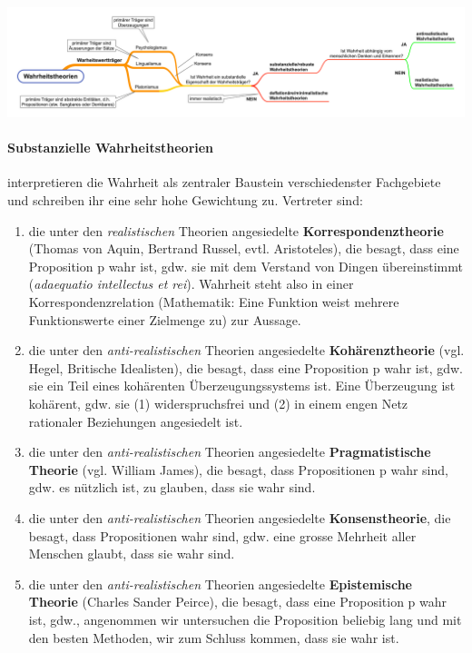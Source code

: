 \documentclass[../main.tex]{subfiles}
\begin{document}
\vspace{10pt}
\includegraphics[width=\textwidth]{images/Wahrheitstheorien_Ueberblick.png}

\paragraph{Substanzielle Wahrheitstheorien} interpretieren die Wahrheit als zentraler Baustein verschiedenster Fachgebiete und schreiben ihr eine sehr hohe Gewichtung zu. Vertreter sind: 
\begin{enumerate}[label=(\alph*)]
	\item die unter den \textit{realistischen} Theorien angesiedelte \textbf{Korrespondenztheorie} (Thomas von Aquin, Bertrand Russel, evtl. Aristoteles), die besagt, dass eine Proposition p wahr ist, gdw. sie mit dem Verstand von Dingen übereinstimmt (\textit{adaequatio intellectus et rei}). Wahrheit steht also in einer Korrespondenzrelation (Mathematik: Eine Funktion weist mehrere Funktionswerte einer Zielmenge zu) zur Aussage.
	\item die unter den \textit{anti-realistischen} Theorien angesiedelte \textbf{Kohärenztheorie} (vgl. Hegel, Britische Idealisten), die besagt, dass eine Proposition p wahr ist, gdw. sie ein Teil eines kohärenten Überzeugungssystems ist. Eine Überzeugung ist kohärent, gdw. sie (1) widerspruchsfrei und (2) in einem engen Netz rationaler Beziehungen angesiedelt ist.
	\item die unter den \textit{anti-realistischen} Theorien angesiedelte \textbf{Pragmatistische Theorie} (vgl. William James), die besagt, dass Propositionen p wahr sind, gdw. es nützlich ist, zu glauben, dass sie wahr sind.
	\item die unter den \textit{anti-realistischen} Theorien angesiedelte \textbf{Konsenstheorie}, die besagt, dass Propositionen wahr sind, gdw. eine grosse Mehrheit aller Menschen glaubt, dass sie wahr sind. 
	\item die unter den \textit{anti-realistischen} Theorien angesiedelte \textbf{Epistemische Theorie} (Charles Sander Peirce), die besagt, dass eine Proposition p wahr ist, gdw., angenommen wir untersuchen die Proposition beliebig lang und mit den besten Methoden, wir zum Schluss kommen, dass sie wahr ist.    
\end{enumerate}
\end{document}
